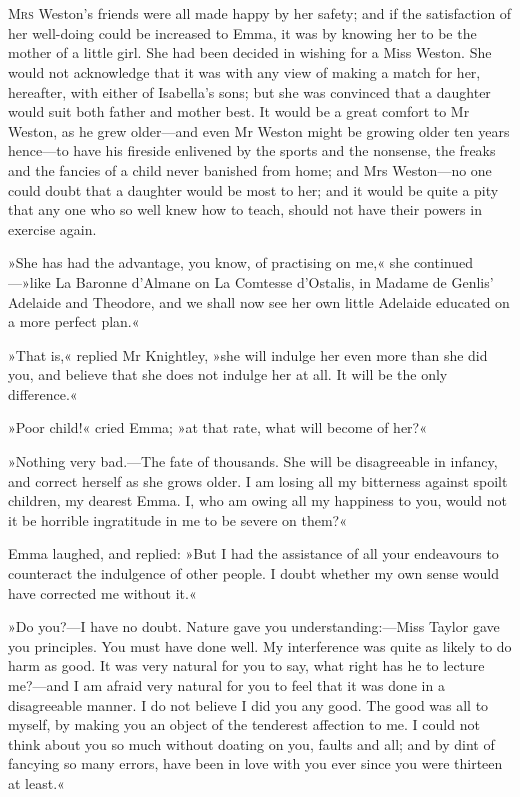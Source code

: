 \chapter[Chapter \thechapter]{}
\lettrine[lines=4,lraise=0.3]{M}{rs} Weston's friends were all made happy by her safety; and if the satisfaction of her well-doing could be increased to Emma, it was by knowing her to be the mother of a little girl. She had been decided in wishing for a Miss Weston. She would not acknowledge that it was with any view of making a match for her, hereafter, with either of Isabella's sons; but she was convinced that a daughter would suit both father and mother best. It would be a great comfort to Mr Weston, as he grew older—and even Mr Weston might be growing older ten years hence—to have his fireside enlivened by the sports and the nonsense, the freaks and the fancies of a child never banished from home; and Mrs Weston—no one could doubt that a daughter would be most to her; and it would be quite a pity that any one who so well knew how to teach, should not have their powers in exercise again.

»She has had the advantage, you know, of practising on me,« she continued—»like La Baronne d'Almane on La Comtesse d'Ostalis, in Madame de Genlis' Adelaide and Theodore, and we shall now see her own little Adelaide educated on a more perfect plan.«

»That is,« replied Mr Knightley, »she will indulge her even more than she did you, and believe that she does not indulge her at all. It will be the only difference.«

»Poor child!« cried Emma; »at that rate, what will become of her?«

»Nothing very bad.—The fate of thousands. She will be disagreeable in infancy, and correct herself as she grows older. I am losing all my bitterness against spoilt children, my dearest Emma. I, who am owing all my happiness to you, would not it be horrible ingratitude in me to be severe on them?«

Emma laughed, and replied: »But I had the assistance of all your endeavours to counteract the indulgence of other people. I doubt whether my own sense would have corrected me without it.«

»Do you?—I have no doubt. Nature gave you understanding:—Miss Taylor gave you principles. You must have done well. My interference was quite as likely to do harm as good. It was very natural for you to say, what right has he to lecture me?—and I am afraid very natural for you to feel that it was done in a disagreeable manner. I do not believe I did you any good. The good was all to myself, by making you an object of the tenderest affection to me. I could not think about you so much without doating on you, faults and all; and by dint of fancying so many errors, have been in love with you ever since you were thirteen at least.«

